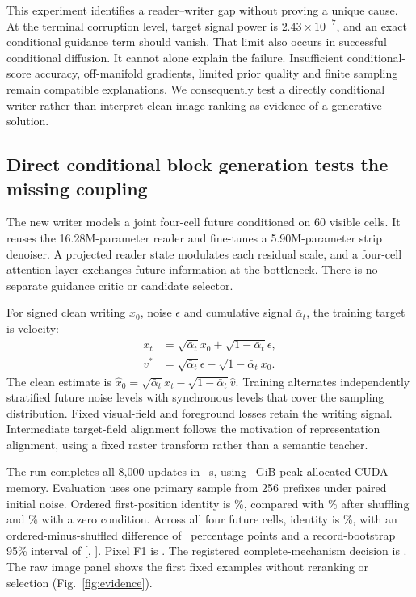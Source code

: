 This experiment identifies a reader--writer gap without proving a unique
cause. At the terminal corruption level, target signal power is
$2.43\times10^{-7}$, and an exact conditional guidance term should vanish.
That limit also occurs in successful conditional diffusion. It cannot alone
explain the failure. Insufficient conditional-score accuracy, off-manifold
gradients, limited prior quality and finite sampling remain compatible
explanations. We consequently test a directly conditional writer rather than
interpret clean-image ranking as evidence of a generative solution.

\subsection*{Direct conditional block generation tests the missing coupling}
The new writer models a joint four-cell future conditioned on 60 visible
cells. It reuses the 16.28M-parameter reader and fine-tunes a 5.90M-parameter
strip denoiser. A projected reader state modulates each residual scale, and a
four-cell attention layer exchanges future information at the bottleneck.
There is no separate guidance critic or candidate selector.

For signed clean writing $x_0$, noise $\epsilon$ and cumulative signal
$\bar\alpha_t$, the training target is velocity:
\begin{align}
x_t&=\sqrt{\bar\alpha_t}x_0+\sqrt{1-\bar\alpha_t}\epsilon,\\
v^*&=\sqrt{\bar\alpha_t}\epsilon-\sqrt{1-\bar\alpha_t}x_0.
\end{align}
The clean estimate is
$\hat x_0=\sqrt{\bar\alpha_t}x_t-\sqrt{1-\bar\alpha_t}\hat v$.
Training alternates independently stratified future noise levels with
synchronous levels that cover the sampling distribution. Fixed visual-field
and foreground losses retain the writing signal. Intermediate target-field
alignment follows the motivation of representation alignment\cite{repa},
using a fixed raster transform rather than a semantic teacher.

The run completes all 8,000 updates in \TrainSeconds\ s, using
\TrainMemory\ GiB peak allocated CUDA memory. Evaluation uses one primary
sample from 256 prefixes under paired initial noise. Ordered first-position
identity is \FirstIdentity\%, compared with \FirstShuffled\% after shuffling
and \FirstZero\% with a zero condition. Across all four future cells, identity
is \BlockIdentity\%, with an ordered-minus-shuffled difference of
\BlockGain\ percentage points and a record-bootstrap 95\% interval of
[\BlockLow, \BlockHigh]. Pixel F1 is \BlockFone.
The registered complete-mechanism decision is \texttt{\RunDecision}.
The raw image panel shows the first fixed examples without reranking or
selection (Fig.~\ref{fig:evidence}).


